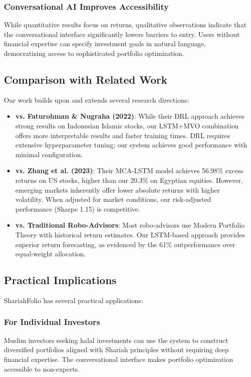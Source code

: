 \documentclass[conference]{IEEEtran}
\begin{document}
\subsubsection{Conversational AI Improves Accessibility}
While quantitative results focus on returns, qualitative observations indicate that the conversational interface significantly lowers barriers to entry. Users without financial expertise can specify investment goals in natural language, democratizing access to sophisticated portfolio optimization.

\subsection{Comparison with Related Work}

Our work builds upon and extends several research directions:

\begin{itemize}
\item \textbf{vs. Faturohman \& Nugraha (2022)}: While their DRL approach achieves strong results on Indonesian Islamic stocks, our LSTM+MVO combination offers more interpretable results and faster training times. DRL requires extensive hyperparameter tuning; our system achieves good performance with minimal configuration.

\item \textbf{vs. Zhang et al. (2023)}: Their MCA-LSTM model achieves 56.98\% excess returns on US stocks, higher than our 20.3\% on Egyptian equities. However, emerging markets inherently offer lower absolute returns with higher volatility. When adjusted for market conditions, our risk-adjusted performance (Sharpe 1.15) is competitive.

\item \textbf{vs. Traditional Robo-Advisors}: Most robo-advisors use Modern Portfolio Theory with historical return estimates. Our LSTM-based approach provides superior return forecasting, as evidenced by the 61\% outperformance over equal-weight allocation.
\end{itemize}

\subsection{Practical Implications}

ShariahFolio has several practical applications:

\subsubsection{For Individual Investors}
Muslim investors seeking halal investments can use the system to construct diversified portfolios aligned with Shariah principles without requiring deep financial expertise. The conversational interface makes portfolio optimization accessible to non-experts.
\end{document}

